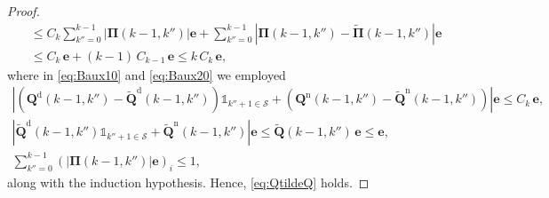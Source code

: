 \documentclass[10pt,a4paper]{amsart}
\newcommand{\tld}[1]{\widetilde{#1}}
\begin{document}
\begin{proof}
\begin{align}
& \le C_{k}\sum_{k''=0}^{k-1}\left|{\bm{\Pi}}(k-1,k'')\right|\bm{e} + \sum_{k''=0}^{k-1}\left| {\bm{\Pi}}(k-1,k'')-\tld{\bm{\Pi}}(k-1,k'')\right|\bm{e} \label{eq:Baux10} \\
& \le C_{k}\,\bm{e} + (k-1)\,C_{k-1}\,\bm{e}\le k\,C_k\,\bm{e},\label{eq:Baux20}
\end{align}
where in \eqref{eq:Baux10} and \eqref{eq:Baux20} we employed
\[
\begin{gathered}
 \left| ({\bm{Q}}^{\mathrm{d}}(k-1,k'')-\tld{\bm{Q}}^{\mathrm{d}}(k-1,k''))\mathds{1}_{k''+1\in \mathcal{S}} + ({\bm{Q}}^{\mathrm{n}}(k-1,k'')-\tld{\bm{Q}}^{\mathrm{n}}(k-1,k''))\right|\bm{e}\le C_{k}\,\bm{e},\\ 
\left|\tld{\bm{Q}}^{\mathrm{d}}(k-1,k'')\mathds{1}_{k''+1\in \mathcal{S}} + \tld{\bm{Q}}^{\mathrm{n}}(k-1,k'')\right|\bm{e}\le \tld{\bm{Q}}(k-1,k'')\,\bm{e} \le \bm{e},\\
\sum_{k''=0}^{k-1}(\left|{\bm{\Pi}}(k-1,k'')\right|\bm{e})_i \le 1,
\end{gathered}
\]
along with the induction hypothesis. Hence, \eqref{eq:QtildeQ} holds.
\end{proof}
\end{document}
